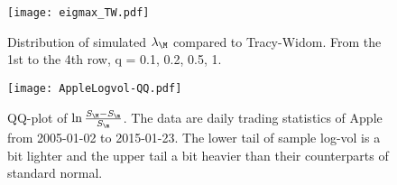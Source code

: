 \documentclass{article}
\begin{document}
\begin{figure}[htb!]
  \centering
  \texttt{[image: eigmax\_TW.pdf]}
  \caption{Distribution of simulated $\lambda_\M$ compared to
    Tracy-Widom. From the 1st to the 4th row, q = 0.1, 0.2, 0.5, 1.}
  \label{fig:eigmax_TW}
\end{figure}

\begin{figure}[htb!]
  \centering
  \texttt{[image: AppleLogvol-QQ.pdf]}
  \caption{QQ-plot of $\ln{ S_\M - S_\m \over S_\m}$. The data are daily trading statistics of Apple from
    2005-01-02 to 2015-01-23. The lower tail of sample log-vol is a
    bit lighter and the upper tail a bit heavier than their
    counterparts of standard normal. }
  \label{fig:qqplot_logvol}
\end{figure}
\end{document}

